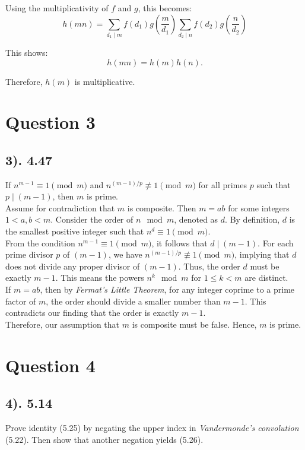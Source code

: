 \documentclass[12pt]{article}
\begin{document}
Using the multiplicativity of \( f \) and \( g \), this becomes:
\[
    h(mn) = \sum_{d_1 \mid m} f(d_1) g\left(\frac{m}{d_1}\right) 
    \sum_{d_2 \mid n} f(d_2) g\left(\frac{n}{d_2}\right)
\]

This shows:
\[ 
    h(mn) = h(m)h(n).
\]

Therefore, \( h(m) \) is multiplicative.

\section*{Question 3}
\subsection*{3). 4.47}
If $n^{m-1} \equiv 1 \pmod{m}$ and $n^{(m-1)/p} \not\equiv 1 \pmod{m}$ for all primes $p$ such that $p \mid (m-1)$, then $m$ is prime. \\

Assume for contradiction that $m$ is composite. Then $m = ab$ for some integers $1 < a, b < m$.
Consider the order of $n \mod m$, denoted as $d$. By definition, $d$ is the smallest positive integer such that $n^d \equiv 1 \pmod{m}$. \\

From the condition $n^{m-1} \equiv 1 \pmod{m}$, it follows that $d \mid (m-1)$.
For each prime divisor $p$ of $(m-1)$, we have $n^{(m-1)/p} \not\equiv 1 \pmod{m}$, implying that $d$ does not divide any proper divisor of $(m-1)$.
Thus, the order $d$ must be exactly $m-1$. This means the powers $n^k \mod m$ for $1 \leq k < m$ are distinct. \\

If $m = ab$, then by \textit{Fermat's Little Theorem}, for any integer coprime to a prime factor of $m$, the order should divide a smaller number than $m-1$.
This contradicts our finding that the order is exactly $m-1$. \\

Therefore, our assumption that $m$ is composite must be false. Hence, $m$ is prime.

\section*{Question 4}
\subsection*{4). 5.14}
Prove identity (5.25) by negating the upper index in \textit{Vandermonde's convolution} (5.22). Then show that another negation yields (5.26). \\
\end{document}
